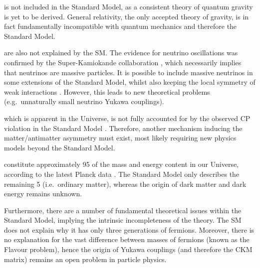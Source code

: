 \begin{description}[wide=\parindent]
\item [Gravity] is not included in the Standard Model, as a consistent theory of quantum gravity is yet to be derived.
General relativity, the only accepted theory of gravity, is in fact fundamentally incompatible with quantum mechanics
and therefore the Standard Model.
\item [Massive neutrinos] are also not explained by the SM. The evidence for neutrino oscillations was confirmed by the
Super-Kamiokande collaboration \autocite{neutrino_oscillations}, which necessarily implies that neutrinos are massive
particles. It is possible to include massive neutrinos in some extensions of the Standard Model, whilst also keeping the
local symmetry of weak interactions \autocite{Shaposhnikov_nuMSM}. However, this leads to new theoretical problems
(e.g.\ unnaturally small neutrino Yukawa couplings).
\item [Matter/antimatter asymmetry,] which is apparent in the Universe, is not fully accounted for by the observed CP
violation in the Standard Model \autocite{Peskin_matter_antimatter, matter_antimatter_asymmetry}. Therefore, another
mechanism inducing the matter/antimatter asymmetry must exist, most likely requiring new physics models beyond the
Standard Model.

\item [Dark matter and dark energy] constitute approximately \SI{95}{\pc} of the mass and energy content in our
Universe, according to the latest Planck data \autocite{planck2013-p01, planck2013-p11}. The Standard Model only
describes the remaining \SI{5}{\pc} (i.e.\ ordinary matter), whereas the origin of dark matter and dark energy remains
unknown.
\end{description}

Furthermore, there are a number of fundamental theoretical issues within the Standard Model, implying the intrinsic
incompleteness of the theory. The SM does not explain why it has only three generations of fermions. Moreover, there is
no explanation for the vast difference between masses of fermions (known as the Flavour problem), hence the origin of
Yukawa couplings (and therefore the CKM matrix) remains an open problem in particle physics.

